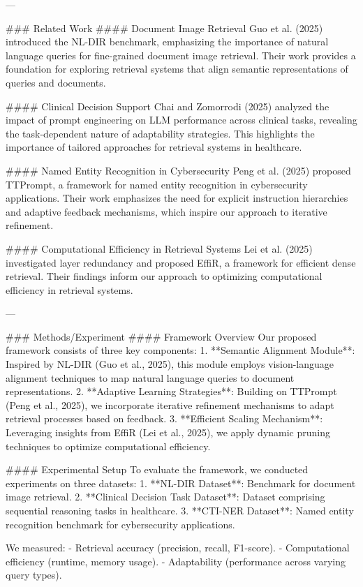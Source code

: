 ---

### Related Work
#### Document Image Retrieval
Guo et al. (2025) introduced the NL-DIR benchmark, emphasizing the importance of natural language queries for fine-grained document image retrieval. Their work provides a foundation for exploring retrieval systems that align semantic representations of queries and documents.

#### Clinical Decision Support
Chai and Zomorrodi (2025) analyzed the impact of prompt engineering on LLM performance across clinical tasks, revealing the task-dependent nature of adaptability strategies. This highlights the importance of tailored approaches for retrieval systems in healthcare.

#### Named Entity Recognition in Cybersecurity
Peng et al. (2025) proposed TTPrompt, a framework for named entity recognition in cybersecurity applications. Their work emphasizes the need for explicit instruction hierarchies and adaptive feedback mechanisms, which inspire our approach to iterative refinement.

#### Computational Efficiency in Retrieval Systems
Lei et al. (2025) investigated layer redundancy and proposed EffiR, a framework for efficient dense retrieval. Their findings inform our approach to optimizing computational efficiency in retrieval systems.

---

### Methods/Experiment
#### Framework Overview
Our proposed framework consists of three key components:
1. **Semantic Alignment Module**: Inspired by NL-DIR (Guo et al., 2025), this module employs vision-language alignment techniques to map natural language queries to document representations.
2. **Adaptive Learning Strategies**: Building on TTPrompt (Peng et al., 2025), we incorporate iterative refinement mechanisms to adapt retrieval processes based on feedback.
3. **Efficient Scaling Mechanism**: Leveraging insights from EffiR (Lei et al., 2025), we apply dynamic pruning techniques to optimize computational efficiency.

#### Experimental Setup
To evaluate the framework, we conducted experiments on three datasets:
1. **NL-DIR Dataset**: Benchmark for document image retrieval.
2. **Clinical Decision Task Dataset**: Dataset comprising sequential reasoning tasks in healthcare.
3. **CTI-NER Dataset**: Named entity recognition benchmark for cybersecurity applications.

We measured:
- Retrieval accuracy (precision, recall, F1-score).
- Computational efficiency (runtime, memory usage).
- Adaptability (performance across varying query types).

